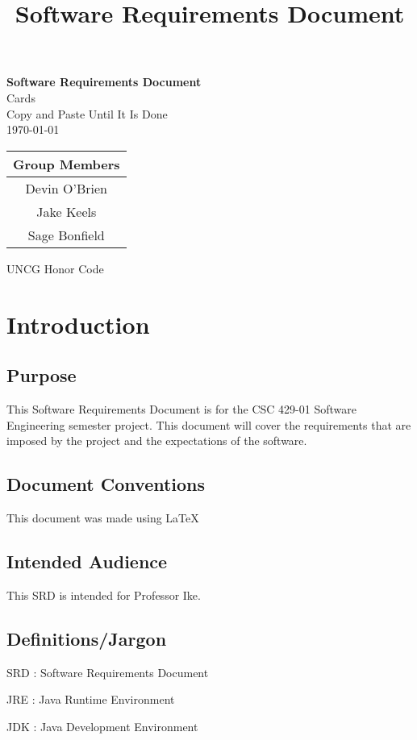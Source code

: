 \documentclass[12pt, draft]{article}
\title{Software Requirements Document}
\begin{document}
\begin{titlepage}
\begin{center}
\Huge
\textbf{Software Requirements Document}\\
\huge Cards\\
\Large
Copy and Paste Until It Is Done\\
\Large \today\\
\begin{tabular}{|c|}
\hline
Group Members\\
\hline
Devin O'Brien\\
Jake Keels\\
Sage Bonfield\\
\hline
\end{tabular}
\large UNCG Honor Code
\end{center}
\end{titlepage}
\section{Introduction}\label{introduction}

\tableofcontents

\newpage
\subsection{Purpose}

This Software Requirements Document is for the CSC 429-01 Software
Engineering semester project. This document will cover the requirements
that are imposed by the project and the expectations of the software.


\subsection{Document Conventions}
This document was made using \LaTeX

\subsection{Intended Audience}
This SRD is intended for Professor Ike. 

\subsection{Definitions/Jargon}
\makeglossaries
SRD : Software Requirements Document

JRE : Java Runtime Environment

JDK : Java Development Environment
\end{document}
